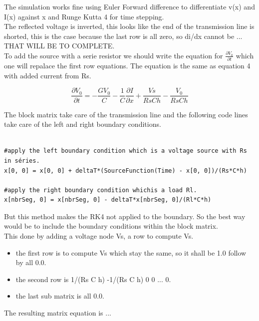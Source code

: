 \documentclass[12pt, letterpaper]{article}
\begin{document}
The simulation works fine using Euler Forward difference to differentiate v(x) and I(x) against x and Runge Kutta 4 for time stepping.\\

The reflected voltage is inverted, this looks like the end of the transmission line is shorted, this is the case because the last row is all zero, so di/dx cannot be ... THAT WILL BE TO COMPLETE.\\

To add the source with a serie resistor we should write the equation for $\frac{\partial{V_0}}{\partial{t}}$ which one will repalace the first row equations. The equation is the same as equation 4 with added current from Rs.



\begin{equation} \frac{\partial{V_0}}{\partial{t}} = -\frac{G V_0}{C} - \frac{1}{C} \frac{\partial{I}}{\partial{x}} + \frac{Vs}{Rs C h} - \frac{V_0}{Rs C h}
\end{equation}

The block matrix take care of the transmission line and the following code lines take care of the left and right boundary conditions.

\begin{verbatim}

#apply the left boundary condition which is a voltage source with Rs in séries.
x[0, 0] = x[0, 0] + deltaT*(SourceFunction(Time) - x[0, 0])/(Rs*C*h)

#apply the right boundary condition whichis a load Rl.
x[nbrSeg, 0] = x[nbrSeg, 0] - deltaT*x[nbrSeg, 0]/(Rl*C*h)
\end{verbatim}

But this method makes the RK4 not applied to the boundary. So the best way would be to include the boundary conditions within the block matrix.\\

This done by adding a voltage node Vs, a row to compute Vs.

\begin{itemize}
	\item the first row is to compute Vs which stay the same, so it shall be 1.0 follow by all 0.0.
	\item the second row is 1/(Rs C h) -1/(Rs C h) 0 0 ... 0.
	\item the last sub matrix is all 0.0.
\end{itemize}

The resulting matrix equation is ...
\end{document}
